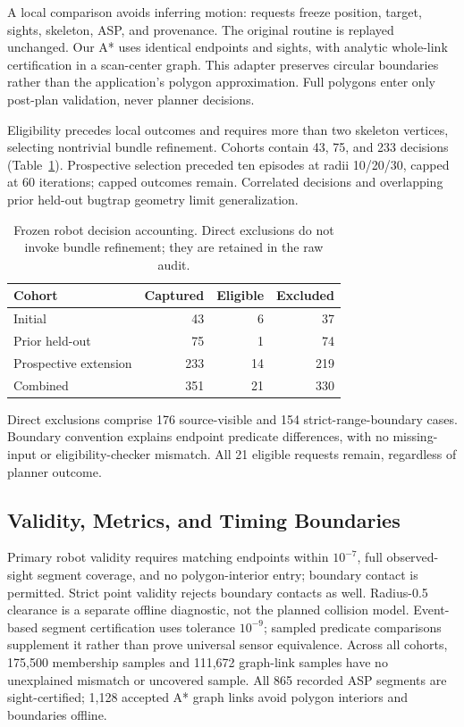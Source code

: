 A local comparison avoids inferring motion: requests freeze position, target, sights, skeleton, ASP, and provenance. The original routine is replayed unchanged. Our A* uses identical endpoints and sights, with analytic whole-link certification in a scan-center graph. This adapter preserves circular boundaries rather than the application's polygon approximation. Full polygons enter only post-plan validation, never planner decisions.

Eligibility precedes local outcomes and requires more than two skeleton vertices, selecting nontrivial bundle refinement. Cohorts contain 43, 75, and 233 decisions (Table~\ref{tab:eligibility}). Prospective selection preceded ten episodes at radii 10/20/30, capped at 60 iterations; capped outcomes remain. Correlated decisions and overlapping prior held-out bugtrap geometry limit generalization.

\begin{table}[H]
\caption{Frozen robot decision accounting. Direct exclusions do not invoke bundle refinement; they are retained in the raw audit.}\label{tab:eligibility}
\centering\begin{tabular}{lrrr}\toprule
Cohort & Captured & Eligible & Excluded\\\midrule
Initial &43&6&37\\
Prior held-out &75&1&74\\
Prospective extension &233&14&219\\\midrule
Combined &351&21&330\\\bottomrule
\end{tabular}
\end{table}

Direct exclusions comprise 176 source-visible and 154 strict-range-boundary cases. Boundary convention explains endpoint predicate differences, with no missing-input or eligibility-checker mismatch. All 21 eligible requests remain, regardless of planner outcome.

\subsection{Validity, Metrics, and Timing Boundaries}
Primary robot validity requires matching endpoints within $10^{-7}$, full observed-sight segment coverage, and no polygon-interior entry; boundary contact is permitted. Strict point validity rejects boundary contacts as well. Radius-0.5 clearance is a separate offline diagnostic, not the planned collision model. Event-based segment certification uses tolerance $10^{-9}$; sampled predicate comparisons supplement it rather than prove universal sensor equivalence. Across all cohorts, 175,500 membership samples and 111,672 graph-link samples have no unexplained mismatch or uncovered sample. All 865 recorded ASP segments are sight-certified; 1,128 accepted A* graph links avoid polygon interiors and boundaries offline.

